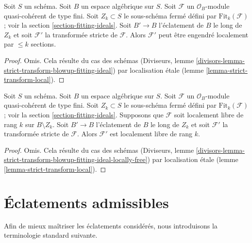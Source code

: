 \begin{lemma}
\label{lemma-strict-transform-blowup-fitting-ideal}
Soit $S$ un schéma. Soit $B$ un espace algébrique sur $S$.
Soit $\mathcal{F}$ un $\mathcal{O}_B$-module quasi-cohérent de type fini.
Soit $Z_k \subset S$ le sous-schéma fermé défini par
$\text{Fit}_k(\mathcal{F})$ ; voir la section \ref{section-fitting-ideals}.
Soit $B' \to B$ l'éclatement de $B$ le long de $Z_k$ et soit
$\mathcal{F}'$ la transformée stricte de $\mathcal{F}$.
Alors $\mathcal{F}'$ peut être engendré localement par $\leq k$
sections.
\end{lemma}

\begin{proof}
Omis. Cela résulte du cas des schémas
(Diviseurs, lemme \ref{divisors-lemma-strict-transform-blowup-fitting-ideal})
par localisation étale (lemme \ref{lemma-strict-transform-local}).
\end{proof}

\begin{lemma}
\label{lemma-strict-transform-blowup-fitting-ideal-locally-free}
Soit $S$ un schéma. Soit $B$ un espace algébrique sur $S$.
Soit $\mathcal{F}$ un $\mathcal{O}_B$-module quasi-cohérent de type fini.
Soit $Z_k \subset S$ le sous-schéma fermé défini par
$\text{Fit}_k(\mathcal{F})$ ; voir la section \ref{section-fitting-ideals}.
Supposons que $\mathcal{F}$ soit localement libre de rang $k$ sur $B \setminus Z_k$.
Soit $B' \to B$ l'éclatement de $B$ le long de $Z_k$ et soit
$\mathcal{F}'$ la transformée stricte de $\mathcal{F}$.
Alors $\mathcal{F}'$ est localement libre de rang $k$.
\end{lemma}

\begin{proof}
Omis. Cela résulte du cas des schémas
(Diviseurs, lemme
\ref{divisors-lemma-strict-transform-blowup-fitting-ideal-locally-free})
par localisation étale (lemme \ref{lemma-strict-transform-local}).
\end{proof}












\section{Éclatements admissibles}
\label{section-admissible-blowups}

\noindent
Afin de mieux maîtriser les éclatements considérés, nous introduisons la
terminologie standard suivante.

